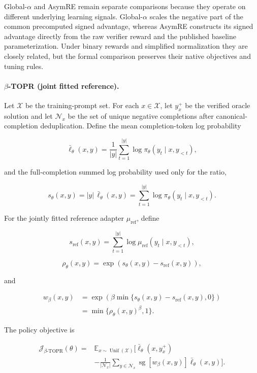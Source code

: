 \documentclass{article}
\theoremstyle{plain}
\theoremstyle{definition}
\theoremstyle{remark}
\begin{document}
Global-\(\alpha\) and AsymRE remain separate comparisons because they
operate on different underlying learning signals. Global-\(\alpha\)
scales the negative part of the common precomputed signed advantage,
whereas AsymRE constructs its signed advantage directly from the raw
verifier reward and the published baseline parameterization. Under
binary rewards and simplified normalization they are closely related,
but the formal comparison preserves their native objectives and tuning
rules.

\paragraph{\(\beta\)-TOPR (joint fitted reference).}

Let \(\mathcal X\) be the training-prompt set. For each
\(x\in\mathcal X\), let \(y_x^+\) be the verified oracle solution and
let \(\mathcal N_x\) be the set of unique negative completions after
canonical-completion deduplication. Define the mean completion-token log
probability

\[
\bar{\ell}_\theta(x,y)
=
\frac{1}{|y|}
\sum_{t=1}^{|y|}
\log\pi_\theta(y_t\mid x,y_{<t}),
\]

and the full-completion summed log probability used only for the ratio,

\[
s_\theta(x,y)
=
|y|\,\bar{\ell}_\theta(x,y)
=
\sum_{t=1}^{|y|}
\log\pi_\theta(y_t\mid x,y_{<t}).
\]

For the jointly fitted reference adapter \(\mu_{\mathrm{ref}}\), define

\[
s_{\mathrm{ref}}(x,y)
=
\sum_{t=1}^{|y|}
\log\mu_{\mathrm{ref}}(y_t\mid x,y_{<t}),
\]

\[
\rho_\theta(x,y)
=
\exp\!\left(s_\theta(x,y)-s_{\mathrm{ref}}(x,y)\right),
\]

and

\[
\begin{aligned}
w_\beta(x,y)
&=
\exp\!\left(
\beta\min\{s_\theta(x,y)-s_{\mathrm{ref}}(x,y),0\}
\right) \\
&=
\min\{\rho_\theta(x,y)^\beta,1\}.
\end{aligned}
\]

The policy objective is

\[
\begin{aligned}
\mathcal J_{\beta\text{-}\mathrm{TOPR}}(\theta)
={}&
\mathbb E_{x\sim\operatorname{Unif}(\mathcal X)}
\Bigg[
\bar{\ell}_\theta(x,y_x^+) \\
&-
\frac{1}{|\mathcal N_x|}
\sum_{y\in\mathcal N_x}
\operatorname{sg}[w_\beta(x,y)]
\bar{\ell}_\theta(x,y)
\Bigg].
\end{aligned}
\]
\end{document}
